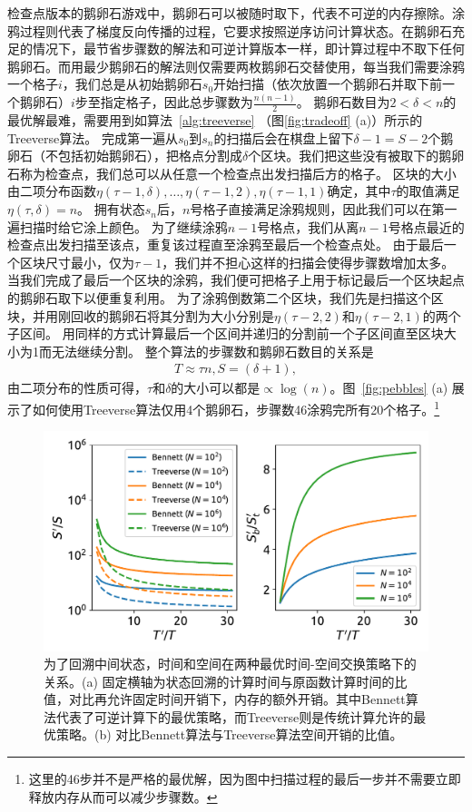 \documentclass[A4,twoside,UTF8]{ctexart}
\begin{document}
检查点版本的鹅卵石游戏中，鹅卵石可以被随时取下，代表不可逆的内存擦除。涂鸦过程则代表了梯度反向传播的过程，它要求按照逆序访问计算状态。在鹅卵石充足的情况下，最节省步骤数的解法和可逆计算版本一样，即计算过程中不取下任何鹅卵石。而用最少鹅卵石的解法则仅需要两枚鹅卵石交替使用，每当我们需要涂鸦一个格子$i$，我们总是从初始鹅卵石$s_0$开始扫描（依次放置一个鹅卵石并取下前一个鹅卵石）$i$步至指定格子，因此总步骤数为$\frac{n(n-1)}{2}$。
鹅卵石数目为$2<\delta<n$的最优解最难，需要用到如算法~\ref{alg:treeverse} （图\ref{fig:tradeoff} (a)）所示的Treeverse算法。
完成第一遍从$s_0$到$s_{n}$的扫描后会在棋盘上留下$\delta-1=S-2$个鹅卵石（不包括初始鹅卵石），把格点分割成$\delta$个区块。我们把这些没有被取下的鹅卵石称为检查点，我们总可以从任意一个检查点出发扫描后方的格子。
区块的大小由二项分布函数$\eta(\tau-1, \delta), \ldots, \eta(\tau-1, 2), \eta(\tau-1, 1)$确定，其中$\tau$的取值满足$\eta(\tau, \delta) = n$。
拥有状态$s_{n}$后，$n$号格子直接满足涂鸦规则，因此我们可以在第一遍扫描时给它涂上颜色。
为了继续涂鸦$n-1$号格点，我们从离$n-1$号格点最近的检查点出发扫描至该点，重复该过程直至涂鸦至最后一个检查点处。
由于最后一个区块尺寸最小，仅为$\tau-1$，我们并不担心这样的扫描会使得步骤数增加太多。
当我们完成了最后一个区块的涂鸦，我们便可把格子上用于标记最后一个区块起点的鹅卵石取下以便重复利用。
为了涂鸦倒数第二个区块，我们先是扫描这个区块，并用刚回收的鹅卵石将其分割为大小分别是$\eta(\tau-2, 2)$和$\eta(\tau-2, 1)$的两个子区间。
用同样的方式计算最后一个区间并递归的分割前一个子区间直至区块大小为1而无法继续分割。
整个算法的步骤数和鹅卵石数目的关系是
\begin{align}
    T \approx \tau n, S = (\delta+1),
\end{align}
由二项分布的性质可得，$\tau$和$\delta$的大小可以都是$\propto\log(n)$。图~\ref{fig:pebbles} (a) 展示了如何使用Treeverse算法仅用4个鹅卵石，步骤数46涂鸦完所有20个格子。\footnote{这里的46步并不是严格的最优解，因为图中扫描过程的最后一步并不需要立即释放内存从而可以减少步骤数。}

\begin{figure}[h]
\centering
\includegraphics[width=0.8\columnwidth]{./fig1.pdf}
    \caption{为了回溯中间状态，时间和空间在两种最优时间-空间交换策略下的关系。(a) 固定横轴为状态回溯的计算时间与原函数计算时间的比值，对比再允许固定时间开销下，内存的额外开销。其中Bennett算法代表了可逆计算下的最优策略，而Treeverse则是传统计算允许的最优策略。(b) 对比Bennett算法与Treeverse算法空间开销的比值。\label{fig:timespace}}
\end{figure}
\end{document}
